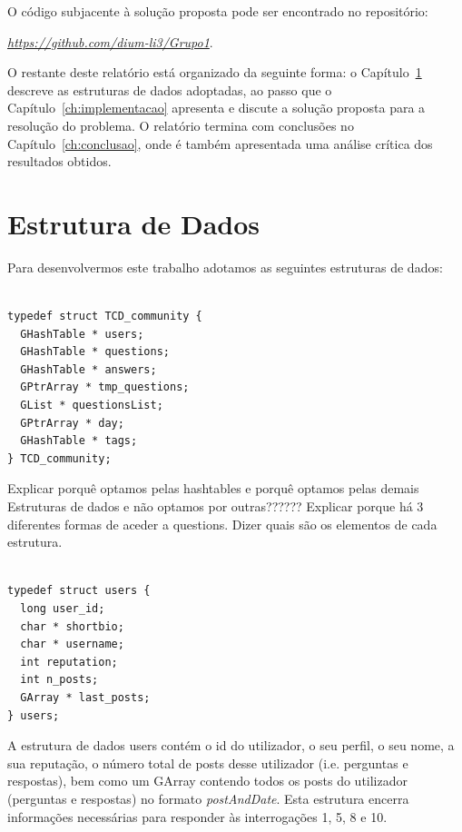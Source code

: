 \documentclass[a4paper]{report}
\begin{document}
O código subjacente à solução proposta pode ser encontrado no repositório:

\begin{center}
\href{https://github.com/dium-li3/Grupo1}{\emph{https://github.com/dium-li3/Grupo1}}.
\end{center}

O restante deste relatório está organizado da seguinte forma: o
Capítulo~\ref{ch:estruturadedados} descreve as estruturas de dados adoptadas,
ao passo que o Capítulo~\ref{ch:implementacao}  apresenta e discute a solução
proposta para a resolução do problema. O relatório termina com conclusões no
Capítulo~\ref{ch:conclusao}, onde é também apresentada uma análise crítica dos
resultados obtidos.



\chapter{Estrutura de Dados}
\label{ch:estruturadedados}

Para desenvolvermos este trabalho adotamos as seguintes estruturas de dados:

\begin{verbatim}

typedef struct TCD_community {
  GHashTable * users;
  GHashTable * questions;
  GHashTable * answers;
  GPtrArray * tmp_questions;
  GList * questionsList;
  GPtrArray * day;
  GHashTable * tags;
} TCD_community;

\end{verbatim}

Explicar porquê optamos pelas hashtables e porquê optamos pelas demais Estruturas
de dados e não optamos por outras??????
Explicar porque há 3 diferentes formas de aceder a questions.
Dizer quais são os elementos de cada estrutura.

\begin{verbatim}

typedef struct users {
  long user_id;
  char * shortbio;
  char * username;
  int reputation;
  int n_posts;
  GArray * last_posts;
} users;

\end{verbatim}

A estrutura de dados users contém o id do utilizador, o seu perfil, o seu nome,
a sua reputação, o número total de posts desse utilizador (i.e. perguntas e respostas),
bem como um GArray contendo todos os posts do utilizador (perguntas e respostas) no
formato \textit{postAndDate}.
Esta estrutura encerra informações necessárias para responder às interrogações 1,
5, 8 e 10.
\end{document}
